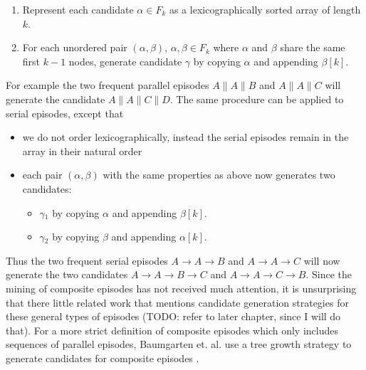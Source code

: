 \begin{enumerate}
	\item Represent each candidate $\alpha \in F_k$ as a lexicographically sorted array of length $k$.
	\item For each unordered pair $(\alpha , \beta )$, $\alpha ,\beta \in F_k$ where $\alpha$ and $\beta$ share the same first $k-1$ nodes, generate candidate $\gamma$ by copying $\alpha$ and appending $\beta [k]$.
\end{enumerate}

For example the two frequent parallel episodes $A \| A \| B$ and $A \| A \| C$ will generate the candidate $A \| A \| C \| D$. \newline
The same procedure can be applied to serial episodes, except that
\begin{itemize}
	\item we do not order lexicographically, instead the serial episodes remain in the array in their natural order
	\item each pair $(\alpha , \beta )$ with the same properties as above now generates two candidates:
	\begin{itemize}
		\item $\gamma{_1}$ by copying $\alpha$ and appending $\beta [k]$.
		\item $\gamma{_2}$ by copying $\beta$ and appending $\alpha [k]$.
	\end{itemize}
\end{itemize}

Thus the two frequent serial episodes $A \rightarrow A \rightarrow B$ and $A \rightarrow A \rightarrow C$ will now generate the two candidates $A \rightarrow A \rightarrow B \rightarrow C$ and $A \rightarrow A \rightarrow C \rightarrow B$. \newline
Since the mining of composite episodes has not received much attention, it is unsurprising that there little related work that mentions candidate generation strategies for these general types of episodes (TODO: refer to later chapter, since I will do that). For a more strict definition of composite episodes which only includes sequences of parallel episodes, Baumgarten et. al. use a tree growth strategy to generate candidates for composite episodes \cite{baumgarten2003tree}. %